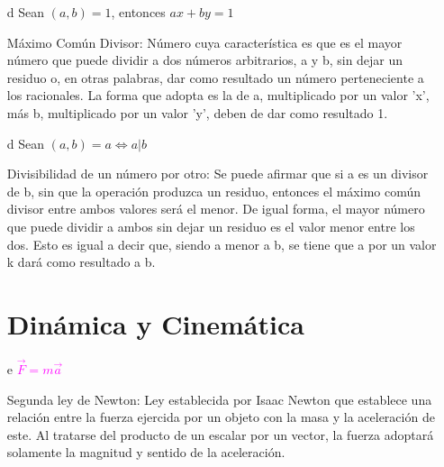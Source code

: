 \documentclass[letterpaper, 12pt]{article}
\begin{document}
\begin{itemize}
    Peque\~no teorema de Fermat: El teorema establece que para un n\'umero primo 'p' cualquiera, si un n\'umero es elevado a dicho, ser'a congruente consigo mismo en m\'odulo p. De igual forma, si el n\'umero es elevado al primo menos uno, entonces el n\'umero ser\'a congruente con 1. En otras palabras, un n\'umero elevado a p, menos si mismo elevado a 1 es divisible por p. Igualmente, ese n\'umero elevado a p-1 menos 1 es divisible por p.\newline
    
    \item[d] Sean $(a,b) = 1$, entonces $ax + by = 1$ \newline

    M\'aximo Com\'un Divisor: N\'umero cuya caracter\'istica es que es el mayor n\'umero que puede dividir a dos n\'umeros arbitrarios, a y b, sin dejar un residuo o, en otras palabras, dar como resultado un n\'umero perteneciente a los racionales. La forma que adopta es la de a, multiplicado por un valor 'x', m\'as b, multiplicado por un valor 'y', deben de dar como resultado 1. \newline
    
    \item[d] Sean $(a,b) = a \Leftrightarrow a|b$ \newline

    Divisibilidad de un n\'umero por otro: Se puede afirmar que si a es un divisor de b, sin que la operaci\'on produzca un residuo, entonces el m\'aximo com\'un divisor entre ambos valores ser\'a el menor. De igual forma, el mayor n\'umero que puede dividir a ambos sin dejar un residuo es el valor menor entre los dos. Esto es igual a decir que, siendo a menor a b, se tiene que a por un valor k dar\'a como resultado a b. \newpage
    
    
\section{Din\'amica y Cinem\'atica} 
    \item[e] \textcolor{magenta}{$\vec F = m\vec a$} \newline

    Segunda ley de Newton: Ley establecida por Isaac Newton que establece una relaci\'on entre la fuerza ejercida por un objeto con la masa y la aceleraci\'on de este. Al tratarse del producto de un escalar por un vector, la fuerza adoptar\'a solamente la magnitud y sentido de la aceleraci\'on. \newline


\end{itemize}
\end{document}
